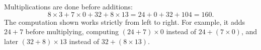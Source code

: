 Multiplications are done before additions:
\[8\times3+7\times0+32+8\times13=24+0+32+104=\boxed{160}.\]
The computation shown works strictly from left to right. For example, it adds $24+7$ before multiplying, computing $(24+7)\times0$ instead of $24+(7\times0)$, and later $(32+8)\times13$ instead of $32+(8\times13)$.
